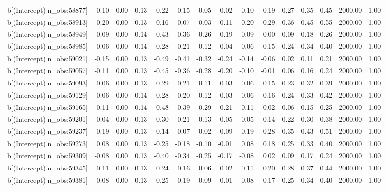 \begin{table}[ht]
\begin{tabular}{rrrrrrrrrrrrrrr}
  b[(Intercept) n\_obs:58877] & 0.10 & 0.00 & 0.13 & -0.22 & -0.15 & -0.05 & 0.02 & 0.10 & 0.19 & 0.27 & 0.35 & 0.45 & 2000.00 & 1.00 \\ 
  b[(Intercept) n\_obs:58913] & 0.20 & 0.00 & 0.13 & -0.16 & -0.07 & 0.03 & 0.11 & 0.20 & 0.29 & 0.36 & 0.45 & 0.55 & 2000.00 & 1.00 \\ 
  b[(Intercept) n\_obs:58949] & -0.09 & 0.00 & 0.14 & -0.43 & -0.36 & -0.26 & -0.19 & -0.09 & -0.00 & 0.09 & 0.18 & 0.26 & 2000.00 & 1.00 \\ 
  b[(Intercept) n\_obs:58985] & 0.06 & 0.00 & 0.14 & -0.28 & -0.21 & -0.12 & -0.04 & 0.06 & 0.15 & 0.24 & 0.34 & 0.40 & 2000.00 & 1.00 \\ 
  b[(Intercept) n\_obs:59021] & -0.15 & 0.00 & 0.13 & -0.49 & -0.41 & -0.32 & -0.24 & -0.14 & -0.06 & 0.02 & 0.11 & 0.21 & 2000.00 & 1.00 \\ 
  b[(Intercept) n\_obs:59057] & -0.11 & 0.00 & 0.13 & -0.45 & -0.36 & -0.28 & -0.20 & -0.10 & -0.01 & 0.06 & 0.16 & 0.24 & 2000.00 & 1.00 \\ 
  b[(Intercept) n\_obs:59093] & 0.06 & 0.00 & 0.13 & -0.29 & -0.21 & -0.11 & -0.03 & 0.06 & 0.15 & 0.23 & 0.32 & 0.39 & 2000.00 & 1.00 \\ 
  b[(Intercept) n\_obs:59129] & 0.06 & 0.00 & 0.14 & -0.28 & -0.20 & -0.12 & -0.03 & 0.06 & 0.16 & 0.24 & 0.33 & 0.42 & 2000.00 & 1.00 \\ 
  b[(Intercept) n\_obs:59165] & -0.11 & 0.00 & 0.14 & -0.48 & -0.39 & -0.29 & -0.21 & -0.11 & -0.02 & 0.06 & 0.15 & 0.25 & 2000.00 & 1.00 \\ 
  b[(Intercept) n\_obs:59201] & 0.04 & 0.00 & 0.13 & -0.30 & -0.21 & -0.13 & -0.05 & 0.05 & 0.14 & 0.22 & 0.30 & 0.38 & 2000.00 & 1.00 \\ 
  b[(Intercept) n\_obs:59237] & 0.19 & 0.00 & 0.13 & -0.14 & -0.07 & 0.02 & 0.09 & 0.19 & 0.28 & 0.35 & 0.43 & 0.51 & 2000.00 & 1.00 \\ 
  b[(Intercept) n\_obs:59273] & 0.08 & 0.00 & 0.13 & -0.25 & -0.18 & -0.10 & -0.01 & 0.08 & 0.18 & 0.25 & 0.33 & 0.40 & 2000.00 & 1.00 \\ 
  b[(Intercept) n\_obs:59309] & -0.08 & 0.00 & 0.13 & -0.40 & -0.34 & -0.25 & -0.17 & -0.08 & 0.02 & 0.09 & 0.17 & 0.24 & 2000.00 & 1.00 \\ 
  b[(Intercept) n\_obs:59345] & 0.11 & 0.00 & 0.13 & -0.24 & -0.16 & -0.06 & 0.02 & 0.11 & 0.20 & 0.28 & 0.37 & 0.44 & 2000.00 & 1.00 \\ 
  b[(Intercept) n\_obs:59381] & 0.08 & 0.00 & 0.13 & -0.25 & -0.19 & -0.09 & -0.01 & 0.08 & 0.17 & 0.25 & 0.34 & 0.40 & 2000.00 & 1.00 \\ 

\end{tabular}
\end{table}
